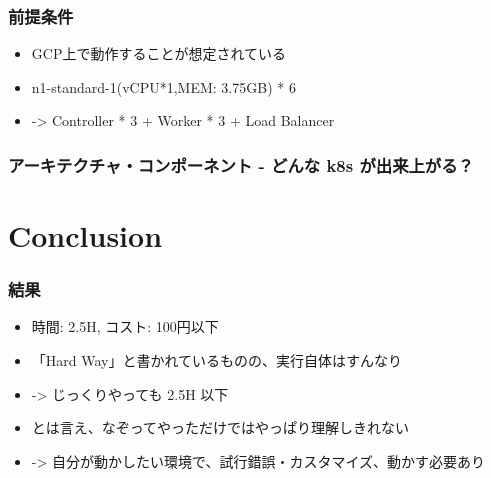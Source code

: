 \documentclass[aspectratio=169,11pt,hyperref={colorlinks=true}]{beamer}
\begin{document}
\begin{frame}
  \frametitle{前提条件}
  \begin{itemize}
    \item GCP上で動作することが想定されている
    \item n1-standard-1(vCPU*1,MEM: 3.75GB) * 6
    \item[] -> Controller * 3 + Worker * 3 + Load Balancer
  \end{itemize}
\end{frame}

\begin{frame}
  \frametitle{アーキテクチャ・コンポーネント - どんな k8s が出来上がる？}
\end{frame}

\section{Conclusion}
\begin{frame}
  \frametitle{結果}
  \begin{itemize}
    \item 時間: 2.5H, コスト: 100円以下
    \item 「Hard Way」と書かれているものの、実行自体はすんなり
    \item[]  -> じっくりやっても 2.5H 以下
    \item とは言え、なぞってやっただけではやっぱり理解しきれない
    \item[] -> 自分が動かしたい環境で、試行錯誤・カスタマイズ、動かす必要あり
  \end{itemize}
\end{frame}
\end{document}
